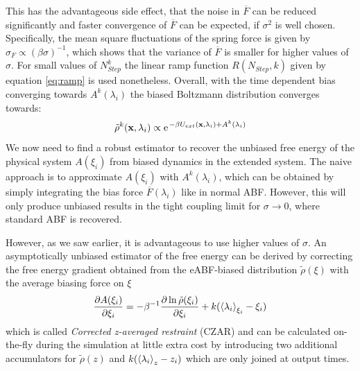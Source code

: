 This has the advantageous side effect, that the noise in $\overline{F}$ can be reduced significantly and faster convergence of $\overline{F}$ can be expected, if $\sigma^2$ is well chosen.\autocite{lesage2017smoothed} Specifically, the mean square fluctuations of the spring force is given by $\sigma_F \propto (\beta\sigma)^{-1}$, which shows that the variance of $\overline{F}$ is smaller for higher values of $\sigma$.
For small values of $N_{Step}^{k}$ the linear ramp function $R(N_{Step},k)$ given by equation \ref{eq:ramp} is used nonetheless. Overall, with the time dependent bias converging towards $A^{k}(\lambda_{i})$ the biased Boltzmann distribution converges towards:
\begin{equation}
  \tilde{\rho}^k(\textbf{x},\lambda_i) \propto \e^{-\beta U_{ext}(\textbf{x},\lambda_i) + A^{k}(\lambda_i)}
\end{equation}
We now need to find a robust estimator to recover the unbiased free energy of the physical system $A(\xi_i)$ from biased dynamics in the extended system.
The naive approach is to approximate $A(\xi_i)$ with $A^k(\lambda_i)$, which can be obtained by simply integrating the bias force $\overline{F}(\lambda_{i})$ like in normal ABF.
However, this will only produce unbiased results in the tight coupling limit for $\sigma \rightarrow 0$, where standard ABF is recovered.

However, as we saw earlier, it is advantageous to use higher values of $\sigma$.
An asymptotically unbiased estimator of the free energy can be derived by correcting the free energy gradient obtained from the eABF-biased distribution $\tilde{\rho}(\xi)$ with the average biasing force on $\xi$
\begin{equation}
  \frac{\partial A(\xi_i)}{\partial \xi_i} = -\beta^{-1}\frac{\partial \ln \tilde{\rho}(\xi_i)}{\partial \xi_i} + k(\braket{\lambda_i}_{\xi_i}-\xi_{i}) \label{eq:CZAR}
\end{equation}
which is called \textit{Corrected z-averaged restraint} (CZAR) and can be calculated on-the-fly during the simulation at little extra cost by introducing two additional accumulators for $\tilde{\rho}(z)$ and $k(\braket{\lambda_i}_{z}-z_{i})$ which are only joined at output times.\autocite{lesage2017smoothed}

